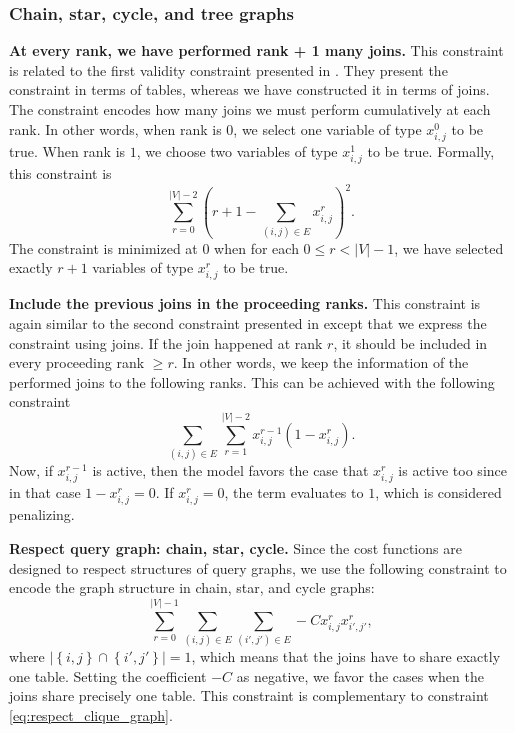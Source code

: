 \subsubsection*{Chain, star, cycle, and tree graphs}

\textbf{At every rank, we have performed rank + 1 many joins.}
This constraint is related to the first validity constraint presented in \cite{Schonberger_Scherzinger_Mauerer,10.14778/3632093.3632112}. They present the constraint in terms of tables, whereas we have constructed it in terms of joins. The constraint encodes how many joins we must perform cumulatively at each rank. In other words, when rank is $0$, we select one variable of type $x_{i,j}^{0}$ to be true. When rank is $1$, we choose two variables of type $x_{i,j}^{1}$ to be true. Formally, this constraint is
\begin{equation}\label{eq:at_every_rank_select_rank_many_joins}
    \sum_{r = 0}^{|V| - 2}\left( r + 1 - \sum_{(i,j) \in E} x_{i,j}^{r} \right)^2.
\end{equation}
The constraint is minimized at $0$ when for each $0 \leq r < |V| - 1$, we have selected exactly $r + 1$ variables of type $x_{i,j}^{r}$ to be true.

\textbf{Include the previous joins in the proceeding ranks.}
This constraint is again similar to the second constraint presented in \cite{Schonberger_Scherzinger_Mauerer,10.14778/3632093.3632112} except that we express the constraint using joins. If the join happened at rank $r$, it should be included in every proceeding rank $\geq r$. In other words, we keep the information of the performed joins to the following ranks. This can be achieved with the following constraint
\begin{equation}\label{eq:select_same_join_for_proceeding_ranks}
    \sum_{(i,j) \in E}\sum_{r = 1}^{|V| - 2} x_{i,j}^{r - 1}(1 - x_{i,j}^{r}).
\end{equation}
Now, if $x_{i,j}^{r - 1}$ is active, then the model favors the case that $x_{i,j}^{r}$ is active too since in that case $1 - x_{i,j}^{r} = 0$. If $x_{i,j}^{r} = 0$, the term evaluates to $1$, which is considered penalizing.

\textbf{Respect query graph: chain, star, cycle.}
Since the cost functions are designed to respect structures of query graphs, we use the following constraint to encode the graph structure in chain, star, and cycle graphs:
\begin{equation}\label{eq:respect_query_graph1}
    \sum_{r = 0}^{|V| - 1}\sum_{(i,j) \in E}\sum_{(i',j') \in E} -C x_{i,j}^{r}x_{i',j'}^{r},
\end{equation}
where $|\left\{ i, j \right\} \cap \left\{ i', j' \right\}| = 1$, which means that the joins have to share exactly one table. Setting the coefficient $-C$ as negative, we favor the cases when the joins share precisely one table. This constraint is complementary to constraint \eqref{eq:respect_clique_graph}.

